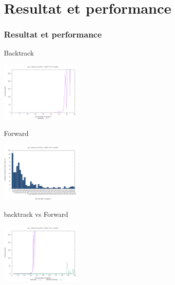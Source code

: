 \documentclass[10pt,a4paper]{beamer}
\begin{document}
\section{Resultat et performance}
\begin{frame}
	\frametitle{Resultat et performance}

	\begin{block}{Backtrack}

	\includegraphics[width=0.3\textwidth]{images/plot_bt_i7.png}

	\end{block}

	\begin{block}{Forward}

	\includegraphics[width=0.3\textwidth]{images/plot_fw_i7.png}

	\end{block}

	\begin{block}{backtrack vs Forward}

	\includegraphics[width=0.3\textwidth]{images/plot_bt_fw_i7.png}

	\end{block}



\end{frame}
\end{document}
